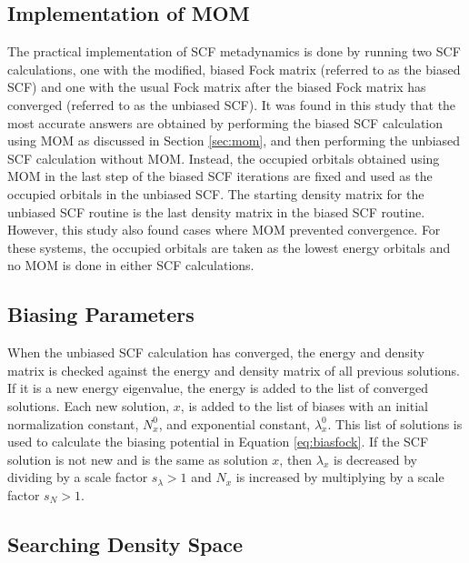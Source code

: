 \documentclass[final,3p,times,twocolumn]{elsarticle}
\begin{document}
\subsection{Implementation of MOM}\label{sec:alg-mom}
The practical implementation of SCF metadynamics is done by running two SCF calculations, one with the modified, biased Fock matrix (referred to as the biased SCF) and one with the usual Fock matrix after the biased Fock matrix has converged (referred to as the unbiased SCF). It was found in this study that the most accurate answers are obtained by performing the biased SCF calculation using MOM as discussed in Section \ref{sec:mom}, and then performing the unbiased SCF calculation without MOM. Instead, the occupied orbitals obtained using MOM in the last step of the biased SCF iterations are fixed and used as the occupied orbitals in the unbiased SCF. The starting density matrix for the unbiased SCF routine is the last density matrix in the biased SCF routine. However, this study also found cases where MOM prevented convergence. For these systems, the occupied orbitals are taken as the lowest energy orbitals and no MOM is done in either SCF calculations.

\subsection{Biasing Parameters}\label{sec:alg-bias}

When the unbiased SCF calculation has converged, the energy and density matrix is checked against the energy and density matrix of all previous solutions. If it is a new energy eigenvalue, the energy is added to the list of converged solutions. Each new solution, $x$, is added to the list of biases with an initial normalization constant, $N_x^0$, and exponential constant, $\lambda_x^0$. This list of solutions is used to calculate the biasing potential in Equation \eqref{eq:biasfock}. If the SCF solution is not new and is the same as solution $x$, then $\lambda_x$ is decreased by dividing by a scale factor $s_\lambda > 1$ and $N_x$ is increased by multiplying by a scale factor $s_N > 1$.

\subsection{Searching Density Space} \label{sec:alg-density}
\end{document}
